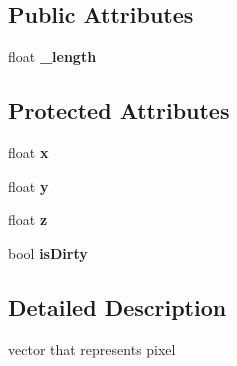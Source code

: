 \subsection*{\-Public \-Attributes}
\begin{DoxyCompactItemize}
\item 
\hypertarget{class_pixel_vector_a968a901c123dcb5817d3453c7cfc3bce}{
float {\bfseries \-\_\-length}}
\label{class_pixel_vector_a968a901c123dcb5817d3453c7cfc3bce}

\end{DoxyCompactItemize}
\subsection*{\-Protected \-Attributes}
\begin{DoxyCompactItemize}
\item 
\hypertarget{class_pixel_vector_a91d6b032f07679d142342bbe9df024c7}{
float {\bfseries x}}
\label{class_pixel_vector_a91d6b032f07679d142342bbe9df024c7}

\item 
\hypertarget{class_pixel_vector_a578c0d962863c91dd1defaf49d9db26a}{
float {\bfseries y}}
\label{class_pixel_vector_a578c0d962863c91dd1defaf49d9db26a}

\item 
\hypertarget{class_pixel_vector_ac43c01ea9e041491b472944cd5c9aed4}{
float {\bfseries z}}
\label{class_pixel_vector_ac43c01ea9e041491b472944cd5c9aed4}

\item 
\hypertarget{class_pixel_vector_a2c227dae7661698288b00ebd39dc1904}{
bool {\bfseries is\-Dirty}}
\label{class_pixel_vector_a2c227dae7661698288b00ebd39dc1904}

\end{DoxyCompactItemize}


\subsection{\-Detailed \-Description}
vector that represents pixel 

